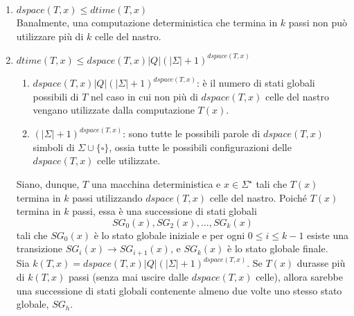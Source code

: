 \begin{enumerate}
    \item {
        $dspace(T, x) \leq dtime(T, x)$\\
        Banalmente, una computazione deterministica che termina in $k$ passi non può utilizzare più di $k$ celle del nastro.
    }
    \item {
        $dtime(T, x) \leq dspace(T, x)|Q|(|\Sigma| + 1)^{dspace(T, x)}$
        \begin{enumerate}
            \item {
                $dspace(T, x)|Q|(|\Sigma| + 1)^{dspace(T, x)}$: è il numero di stati globali possibili di $T$ nel caso in cui non più di $dspace(T, x)$ celle del nastro 
                vengano utilizzate dalla computazione $T(x)$.
            }
            \item {
                $(|\Sigma| + 1)^{dspace(T, x)}$: sono tutte le possibili parole di $dspace(T, x)$ simboli di $\Sigma \cup \{\square\}$, ossia tutte le possibili
                configurazioni delle $dspace(T, x)$ celle utilizzate.
            }
        \end{enumerate}
        Siano, dunque, $T$ una macchina deterministica e $x\in \Sigma^{\star}$ tali che $T(x)$ termina in $k$ passi utilizzando
        $dspace(T, x)$ celle del nastro. Poiché $T(x)$ termina in $k$ passi, essa è una successione di stati globali 
        $$SG_{0}(x), SG_{2}(x), \dots, SG_{k}(x)$$
        tali che $SG_{0}(x)$ è lo stato globale iniziale e per ogni $0 \leq i \leq k - 1$ esiste una transizione
        $SG_{i}(x) \rightarrow SG_{i + 1}(x)$, e  $SG_{k}(x)$ è lo stato globale finale.\\
        Sia $k(T, x) = dspace(T, x)|Q|(|\Sigma| + 1)^{dspace(T, x)}$. Se $T(x)$ durasse più di $k(T, x)$ passi (senza mai uscire
        dalle $dspace(T, x)$ celle), allora sarebbe una successione di stati globali contenente almeno due volte uno stesso stato globale, $SG_{h}$.
        
        \begin{figure}[h]
            \centering
\end{figure}}
\end{enumerate}
